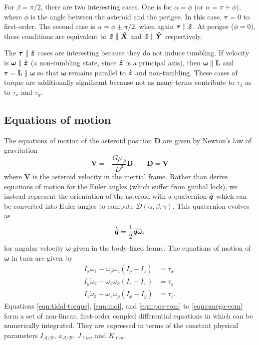 For $\beta = \pi/2$, there are two interesting cases. One is for $\alpha = \phi$ (or $\alpha = \pi + \phi$), where $\phi$ is the angle between the asteroid and the perigee. In this case, $\bm \tau = 0$ to first-order. The second case is $\alpha = \phi \pm \pi/2$, when again $\bm \tau \parallel \bm{\hat{z}}$. At perigee ($\phi=0$), these conditions are equivalent to $\bm{\hat{z}} \parallel \bm{\hat{X}}$ and $\bm{\hat{z}} \parallel \bm{\hat{Y}}$ respectively.

The $\bm \tau \parallel \bm{\hat{z}}$ cases are interesting because they do not induce tumbling. If velocity is $\bm \omega \parallel \bm{\hat{z}}$ (a non-tumbling state, since $\bm{\hat{z}}$ is a principal axis), then $\bm \omega \parallel \bm L$ and $\bm \tau = \dot{\bm L} \parallel \dot{\bm \omega}$ so that $\bm \omega$ remains parallel to $\bm{\hat{z}}$ and non-tumbling. These cases of torque are additionally significant because not as many terms contribute to $\tau_z$ as to $\tau_x$ and $\tau_y$.

\subsection{Equations of motion}
\label{sec:eom}


The equations of motion of the asteroid position $\bm D$ are given by Newton's law of gravitation
\begin{equation}
  \dot{\bm V} = -\frac{G \mu_\mathcal{B}}{D^3} \bm D \qquad \dot{\bm D} = \bm V
  \label{eqn:pos-eom}
\end{equation}
where $\bm V$ is the asteroid velocity in the inertial frame. Rather than derive equations of motion for the Euler angles (which suffer from gimbal lock), we instead represent the orientation of the asteroid with a quaternion $\widetilde{\bm{q}}$ which can be converted into Euler angles to compute $\mathcal{D}(\alpha, \beta, \gamma)$. This quaternion evolves as 
\begin{equation}
  \dot{\widetilde{\bm{q}}} = \frac{1}{2}\widetilde{\bm{q}}\widetilde{\bm{\omega}}.
  \label{eqn:quat-eom}
\end{equation}
for angular velocity $\bm \omega$ given in the body-fixed frame. The equations of motion of $\bm \omega$ in turn are given by
\begin{equation}
  \begin{split}
    I_x \dot \omega_1 - \omega_y \omega_z (I_y - I_z) &= \tau_x\\
    I_y \dot \omega_2 - \omega_z \omega_x (I_z - I_x) &= \tau_y\\
    I_z \dot \omega_3 - \omega_x \omega_y (I_x - I_y) &= \tau_z.
  \end{split}
  \label{eqn:omega-eom}
\end{equation}
Equations \ref{eqn:tidal-torque}, \ref{eqn:moi}, and \ref{eqn:pos-eom} to \ref{eqn:omega-eom} form a set of non-linear, first-order coupled differential equations in which can be numerically integrated. They are expressed in terms of the constant physical parameters $I_\mathcal{A/B}$, $a_\mathcal{A/B}$, $J_{\ell m}$, and $K_{\ell m}$.





